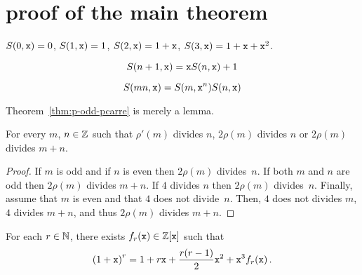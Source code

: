 
\section{proof of the main theorem}


   $S(0, \mathtt{x}) = 0$, $S(1, \mathtt{x}) = 1$, $S(2, \mathtt{x}) = 1 + \mathtt{x}$, $S(3, \mathtt{x}) = 1 + \mathtt{x} + \mathtt{x}^2$.

   $$
   S(n + 1, \mathtt{x}) = \mathtt{x} S(n, \mathtt{x}) + 1
   $$

   $$
   S(mn, \mathtt{x}) = S(m, \mathtt{x}^n) S(n, \mathtt{x})
   $$

\cite{HullDobell62}   

Theorem~\ref{thm:p-odd-pcarre} is merely a lemma.

\begin{theorem}
  For every $m$, $n \in \mathbb{Z}$ such that $\rho'(m)$ divides $n$,
  $2 \rho(m)$ divides $n$ or $2 \rho(m)$ divides $m + n$.
\end{theorem}

\begin{proof}
  
  If $m$ is odd and if $n$ is even then $2 \rho(m)$ divides~$n$.
  If both $m$ and $n$ are odd then $2 \rho(m)$ divides $m + n$.
  If $4$ divides $n$ then $2 \rho(m)$ divides~$n$.
  Finally, assume that $m$ is even and that $4$ does not divide~$n$.
  Then, $4$ does not divides $m$, $4$ divides $m + n$, and thus $2 \rho(m)$ divides $m + n$.
\end{proof}

\begin{theorem}
  For each $r \in \mathbb{N}$, there exists $f_r(\mathtt{x}) \in \mathbb{Z}[\mathtt{x}]$ such that 
  $$
  {(1 + \mathtt{x})}^r = 1 + r \mathtt{x} + \frac{r(r - 1)}{2} \mathtt{x}^2 + \mathtt{x}^3 f_r(\mathtt{x}) \, .
  $$
\end{theorem}

